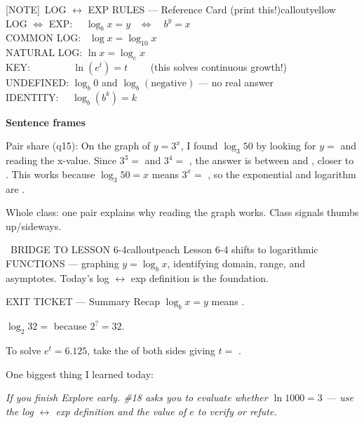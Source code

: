 \documentclass[11pt]{article}
\newcommand{\IconNote}{[NOTE]}
\newcommand{\rulescardcontent}{%
LOG \(\Leftrightarrow\) EXP: \ \ \(\log_b x = y\) \ \(\Leftrightarrow\)\ \ \(b^y = x\)\\
COMMON LOG: \ \(\log x = \log_{10} x\)\\
NATURAL LOG: \(\ln x = \log_e x\)\\
KEY: \ \ \ \ \ \ \ \ \(\ln(e^t) = t\) \ \ \ \ (this solves continuous growth!)\\
UNDEFINED: \(\log_b 0\) and \(\log_b(\text{negative})\) --- no real answer\\
IDENTITY: \ \ \(\log_b(b^k) = k\)%
}
\begin{document}

\begin{callout}{\IconNote\ LOG \(\leftrightarrow\) EXP RULES --- Reference Card (print this!)}{calloutyellow}
\rulescardcontent
\end{callout}


\begin{sentenceframebox}
\textbf{Sentence frames}

Pair share (q15): On the graph of \(y = 3^x\), I found \(\log_3 50\) by looking for \(y =\) \blank[0.5in] and reading the x-value. Since \(3^3 =\) \blank[0.45in] and \(3^4 =\) \blank[0.45in], the answer is between \blank[0.45in] and \blank[0.45in], closer to \blank[0.65in]. This works because \(\log_3 50 = x\) means \(3^x =\) \blank[0.45in], so the exponential and logarithm are \blank[1in].

Whole class: one pair explains why reading the graph works. Class signals thumbs up/sideways.
\end{sentenceframebox}

\begin{callout}{\IconSearch\ BRIDGE TO LESSON 6-4}{calloutpeach}
Lesson 6-4 shifts to logarithmic FUNCTIONS --- graphing \(y = \log_b x\), identifying domain, range, and asymptotes. Today's log \(\leftrightarrow\) exp definition is the foundation.
\end{callout}


\begin{summaryexitbox}{EXIT TICKET --- Summary Recap}
\(\log_b x = y\) means \blank[1.5in].

\(\log_2 32 =\) \blank[0.5in] because \(2^{?} = 32\).

To solve \(e^t = 6.125\), take the \blank[0.9in] of both sides giving \(t =\) \blank[0.8in].

One biggest thing I learned today: \blank[2.7in]
\end{summaryexitbox}

\clearpage

\textit{If you finish Explore early. \#18 asks you to evaluate whether \(\ln 1000 = 3\) --- use the log \(\leftrightarrow\) exp definition and the value of \(e\) to verify or refute.}

\end{document}
